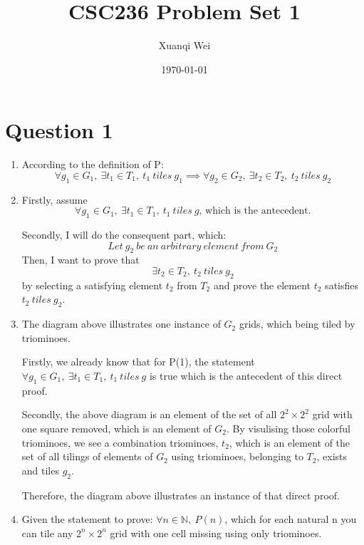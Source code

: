 \documentclass[12pt]{article}
\title{CSC236 Problem Set 1}
\author{Xuanqi Wei}
\date{\today}
\begin{document}
\maketitle
\thispagestyle{empty}

\newpage

\tableofcontents
\thispagestyle{empty}

\newpage

\setcounter{page}{1}

\section{Question 1}
\begin{enumerate}[label=(\alph*)]
    \item According to the definition of P:
    $$\forall g_1 \in G_1,\ \exists t_1 \in T_1,\ t_1\ tiles\ g_1 \implies \forall g_2 \in G_2,\ \exists t_2 \in T_2,\ t_2\ tiles\ g_2 $$

    \item 
    Firstly, assume $$\forall g_1 \in G_1,\ \exists t_1 \in T_1,\ t_1\ tiles\ g\text{, which is the antecedent.}$$
    
    Secondly, I will do the consequent part, which: $$Let\ g_2\ be\ an\ arbitrary\ element\ from\ G_2$$ 
    Then, I want to prove that $$\exists t_2 \in T_2,\ t_2\ tiles\ g_2$$ \quad \quad \quad \quad \quad \quad \quad by selecting a satisfying element $t_2$ from $T_2$ 
    and prove the element $t_2$ satisfies $t_2\ tiles\ g_2$.

    \item The diagram above illustrates one instance of $G_2$ grids, which being tiled by triominoes.
    
    Firstly, we already know that for P(1), the statement $\forall g_1 \in G_1,\ \exists t_1 \in T_1,\ t_1\ tiles\ g$ is true which is the antecedent of this direct proof.

    Secondly, the above diagram is an element of the set of all $2^2 \times 2^2$ grid with one square removed, which is an element of $G_2$. 
    By visulising those colorful triominoes, we see a combination triominoes, $t_2$, which is an element of the set of all tilings of elements of $G_2$ using triominoes, belonging to $T_2$, exists and tiles $g_2$.

    Therefore, the diagram above illustrates an instance of that direct proof.

    \item Given the statement to prove: $\forall n \in \mathbb{N},\ P(n)$, which for each natural n you can tile any $2^n \times 2^n$ grid with one cell missing using only triominoes.
    

\end{enumerate}
\end{document}
